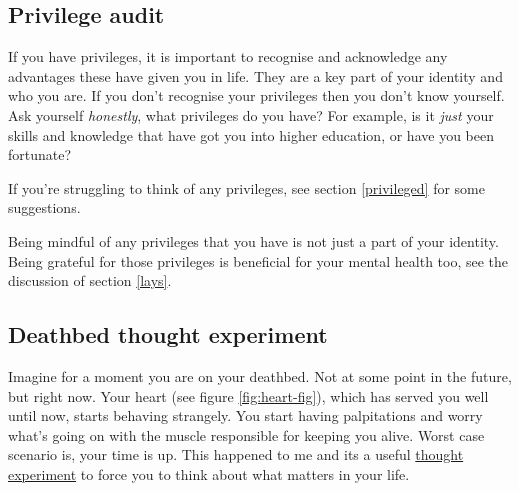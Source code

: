 \documentclass[
]{book}
\begin{document}
\hypertarget{apriv}{%
\subsection{Privilege audit}\label{apriv}}

If you have privileges, it is important to recognise and acknowledge any advantages these have given you in life. They are a key part of your identity and who you are. If you don't recognise your privileges then you don't know yourself. Ask yourself \emph{honestly}, what privileges do you have? For example, is it \emph{just} your skills and knowledge that have got you into higher education, or have you been fortunate?

If you're struggling to think of any privileges, see section \ref{privileged} for some suggestions.

Being mindful of any privileges that you have is not just a part of your identity. Being grateful for those privileges is beneficial for your mental health too, see the discussion of section \ref{lays}.

\hypertarget{regrets}{%
\subsection{Deathbed thought experiment}\label{regrets}}

Imagine for a moment you are on your deathbed. Not at some point in the future, but right now. Your heart (see figure \ref{fig:heart-fig}), which has served you well until now, starts behaving strangely. You start having palpitations and worry what's going on with the muscle responsible for keeping you alive. Worst case scenario is, your time is up. This happened to me and its a useful \href{https://en.wikipedia.org/wiki/Thought_experiment}{thought experiment} to force you to think about what matters in your life. \citep{deathbed}
\end{document}

